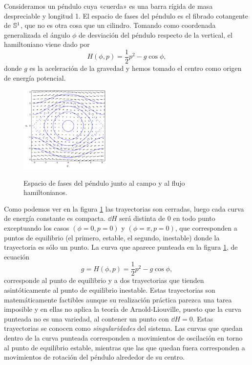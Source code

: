 \begin{ejemplo}
  Consideramos un péndulo cuya «cuerda» es una barra rígida de masa despreciable y longitud 1. El espacio de fases del péndulo es el fibrado cotangente de $\mathbb{S}^1$, que no es otra cosa que un cilindro. Tomando como coordenada generalizada el ángulo $\phi$ de desviación del péndulo respecto de la vertical, el hamiltoniano viene dado por 
  \begin{equation*}
    H(\phi,p)=\frac{1}{2}p^2 - g\cos\phi,
  \end{equation*}
  donde $g$ es la aceleración de la gravedad y hemos tomado el centro como origen de energía potencial.
  \begin{figure}[h]
    \centering
    \includegraphics[width=0.4\textwidth]{pics/pendulo}
    \label{fig:pendulo}
    \caption{Espacio de fases del péndulo junto al campo y al flujo hamiltonianos.}
  \end{figure}
  Como podemos ver en la figura \ref{fig:pendulo}  las trayectorias son cerradas, luego cada curva de energía constante es compacta. $\dd H$ será distinta de 0 en todo punto exceptuando los casos $(\phi=0,p=0)$ y $(\phi=\pi,p=0)$, que corresponden a puntos de equilibrio (el primero, estable, el segundo, inestable) donde la trayectoria es sólo un punto. La curva que aparece punteada en la figura \ref{fig:pendulo}, de ecuación
  \begin{equation*}
    g=H(\phi,p)=\frac{1}{2}p^2 - g \cos\phi ,
  \end{equation*}
  corresponde al punto de equilibrio y a dos trayectorias que tienden asintóticamente al punto de equilibrio inestable. Estas trayectorias son matemáticamente factibles aunque su realización práctica parezca una tarea imposible y en ellas no aplica la teoría de Arnold-Liouville, puesto que la curva punteada no es una variedad, al contener un punto con $\dd H=0$. Estas trayectorias se conocen como \emph{singularidades} del sistema. Las curvas que quedan dentro de la curva punteada corresponden a movimientos de oscilación en torno al punto de equilibrio estable, mientras que las que quedan fuera corresponden a movimientos de rotación del péndulo alrededor de su centro. 
\end{ejemplo}
